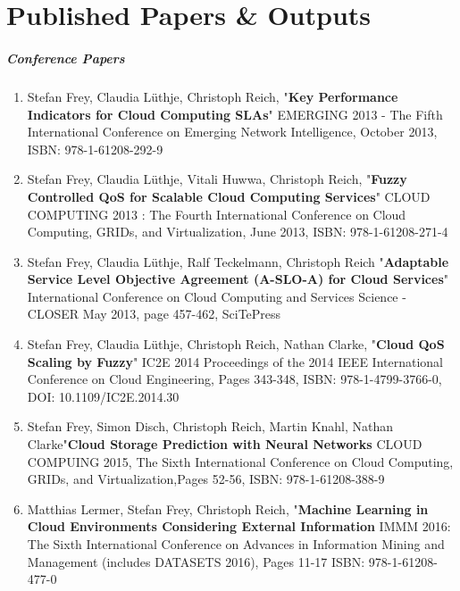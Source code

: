 %
%

\chapter{Published Papers \& Outputs}
\label{app:app01}
\paragraph{Conference Papers}
\begin{enumerate}
	\item Stefan Frey, Claudia L\"uthje, Christoph Reich, "\textbf{Key Performance Indicators for Cloud Computing SLAs}"
	EMERGING 2013 - The Fifth International Conference on Emerging Network Intelligence, October 2013, ISBN: 978-1-61208-292-9
	
	\item Stefan Frey, Claudia L\"uthje, Vitali Huwwa, Christoph Reich, "\textbf{Fuzzy Controlled QoS for Scalable Cloud Computing Services}" CLOUD COMPUTING 2013 : The Fourth International Conference on Cloud Computing, GRIDs, and Virtualization, June 2013, ISBN: 978-1-61208-271-4
	
	\item Stefan Frey, Claudia L\"uthje, Ralf Teckelmann, Christoph Reich "\textbf{Adaptable Service Level Objective Agreement (A-SLO-A) for Cloud Services}" International Conference on Cloud Computing and Services Science - CLOSER May 2013, page 457-462, SciTePress
	
	\item Stefan Frey, Claudia L\"uthje, Christoph Reich, Nathan Clarke, "\textbf{Cloud QoS Scaling by Fuzzy}" IC2E 2014 Proceedings of the 2014 IEEE International Conference on Cloud Engineering, Pages 343-348, ISBN: 978-1-4799-3766-0, DOI: 10.1109/IC2E.2014.30
	
	\item Stefan Frey, Simon Disch, Christoph Reich, Martin Knahl, Nathan Clarke"\textbf{Cloud Storage Prediction with Neural Networks} CLOUD COMPUING 2015, The Sixth International Conference on Cloud Computing, GRIDs, and Virtualization,Pages 52-56, ISBN: 978-1-61208-388-9
	
	\item Matthias Lermer, Stefan Frey,	Christoph Reich, "\textbf{Machine Learning in Cloud Environments Considering External Information} IMMM 2016: The Sixth International Conference on Advances in Information Mining and Management (includes DATASETS 2016), Pages 11-17 ISBN: 978-1-61208-477-0
	
\end{enumerate}


